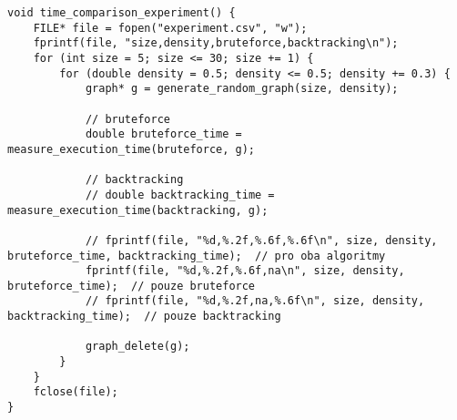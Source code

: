 \documentclass[a4paper]{article}
\begin{document}
    \begin{lstlisting}[caption={Zjednodušený kód hlavní funkce souboru \lstinline{experiment.c} nastavena pro generaci grafů velikosti 5 až 30 s hustotou 0,5 pro algoritmus metody hrubé síly.}, captionpos=b, label={code:experiment}]
void time_comparison_experiment() {
    FILE* file = fopen("experiment.csv", "w");
    fprintf(file, "size,density,bruteforce,backtracking\n");
    for (int size = 5; size <= 30; size += 1) { 
        for (double density = 0.5; density <= 0.5; density += 0.3) {
            graph* g = generate_random_graph(size, density);

            // bruteforce
            double bruteforce_time = measure_execution_time(bruteforce, g);

            // backtracking
            // double backtracking_time = measure_execution_time(backtracking, g);

            // fprintf(file, "%d,%.2f,%.6f,%.6f\n", size, density, bruteforce_time, backtracking_time);  // pro oba algoritmy
            fprintf(file, "%d,%.2f,%.6f,na\n", size, density, bruteforce_time);  // pouze bruteforce
            // fprintf(file, "%d,%.2f,na,%.6f\n", size, density, backtracking_time);  // pouze backtracking

            graph_delete(g);
        }
    }
    fclose(file);
}
    \end{lstlisting}

    
    
    


\end{document}
